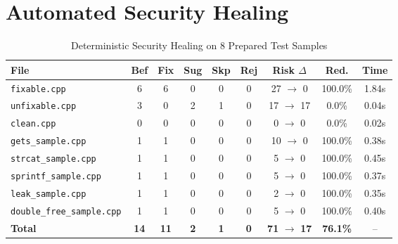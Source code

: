 \documentclass{article}
\begin{document}
\section{Automated Security Healing}
\begin{table}[htbp]
\centering
\caption{Deterministic Security Healing on 8 Prepared Test Samples}
\label{tab:healing}
\begin{tabularx}{\textwidth}{l c c c c c c c c}
\toprule
\textbf{File} & \textbf{Bef} & \textbf{Fix} & \textbf{Sug} & \textbf{Skp} & \textbf{Rej} & \textbf{Risk $\Delta$} & \textbf{Red.} & \textbf{Time} \\
\midrule
\texttt{fixable.cpp} & 6 & 6 & 0 & 0 & 0 & 27 $\rightarrow$ 0 & 100.0\% & 1.84s \\
\texttt{unfixable.cpp} & 3 & 0 & 2 & 1 & 0 & 17 $\rightarrow$ 17 & 0.0\% & 0.04s \\
\texttt{clean.cpp} & 0 & 0 & 0 & 0 & 0 & 0 $\rightarrow$ 0 & 0.0\% & 0.02s \\
\texttt{gets\_sample.cpp} & 1 & 1 & 0 & 0 & 0 & 10 $\rightarrow$ 0 & 100.0\% & 0.38s \\
\texttt{strcat\_sample.cpp} & 1 & 1 & 0 & 0 & 0 & 5 $\rightarrow$ 0 & 100.0\% & 0.45s \\
\texttt{sprintf\_sample.cpp} & 1 & 1 & 0 & 0 & 0 & 5 $\rightarrow$ 0 & 100.0\% & 0.37s \\
\texttt{leak\_sample.cpp} & 1 & 1 & 0 & 0 & 0 & 2 $\rightarrow$ 0 & 100.0\% & 0.35s \\
\texttt{double\_free\_sample.cpp} & 1 & 1 & 0 & 0 & 0 & 5 $\rightarrow$ 0 & 100.0\% & 0.40s \\
\midrule \textbf{Total} & \textbf{14} & \textbf{11} & \textbf{2} & \textbf{1} & \textbf{0} & \textbf{71} $\rightarrow$ \textbf{17} & \textbf{76.1\%} & -- \\
\bottomrule
\end{tabularx}
\end{table}
\end{document}

